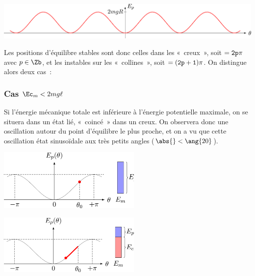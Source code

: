 \documentclass[../../main/main.tex]{subfiles}
\begin{document}
\begin{center}
	\includegraphics[scale=1]{stab_pend-a}
\end{center}
Les positions d'équilibre stables sont donc celles dans les «~creux~», soit $\tt =
	2p\pi$ avec $p\in\Zb$, et les instables sur les «~collines~», soit $\tt =
	(2p+1)\pi$. On distingue alors deux cas~:

\subsubsection{Cas $\Ec_m < 2mg\ell$}
Si l'énergie mécanique totale est inférieure à l'énergie potentielle maximale, on se
situera dans un état lié, «~coincé~» dans un creux. On observera donc une
oscillation autour du point d'équilibre le plus proche, et on a vu que cette
oscillation état sinusoïdale aux très petits angles ($\abs{\tt} < \ang{20}$).

\begin{minipage}{0.45\linewidth}
	\begin{center}
		\includegraphics[width=7cm]{stab_pend-b}
	\end{center}
\end{minipage}
\hfill
\begin{minipage}{0.45\linewidth}
	\begin{center}
		\includegraphics[width=7cm]{stab_pend-c}
	\end{center}
\end{minipage}
\end{document}
